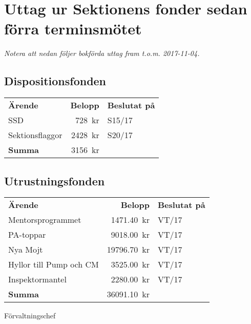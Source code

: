 \documentclass[../_main/handlingar.tex]{subfiles}
\begin{document}
\section{Uttag ur Sektionens fonder sedan förra terminsmötet}
\emph{Notera att nedan följer bokförda uttag fram t.o.m. 2017-11-04.}

\subsection*{Dispositionsfonden}
\begin{tabular}{l r l}
    \textbf{Ärende} & \textbf{Belopp} & \textbf{Beslutat på} \\
    SSD & \SI{728}{kr} & S15/17 \\
    Sektionsflaggor & \SI{2428}{kr} & S20/17 \\
    \hline
    \textbf{Summa} & \SI{3156}{kr} \\
\end{tabular}

\subsection*{Utrustningsfonden}
\begin{tabular}{l r l}
    \textbf{Ärende} & \textbf{Belopp} & \textbf{Beslutat på} \\
    Mentorsprogrammet & \SI{1471.40}{kr} & VT/17 \\
    PA-toppar & \SI{9018.00}{kr} & VT/17 \\
    Nya Mojt & \SI{19796.70}{kr} & VT/17 \\
    Hyllor till Pump och CM & \SI{3525.00}{kr} & VT/17 \\
    Inspektormantel & \SI{2280.00}{kr} & VT/17 \\
    \hline
    \textbf{Summa} & \SI{36091.10}{kr} \\
\end{tabular}

\begin{signatures}{1}
    \ist
    \signature{Magnus Lundh}{Förvaltningschef}
\end{signatures}
\end{document}

